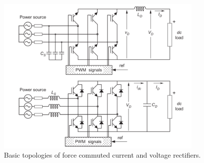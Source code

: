 \begin{figure}[!ht]
        \centering
        \includegraphics[width=0.9\textwidth]{EMPC_PNG_Pics/CurrentVoltageRectifiers.png}
        \caption{Basic topologies of force commuted current and voltage rectifiers.}
        \label{BASICCSR:fig:topologies}
    \end{figure}


